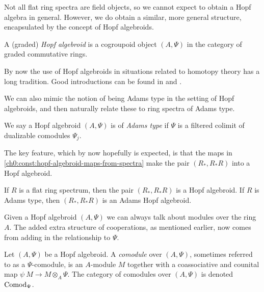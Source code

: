 Not all flat ring spectra are field objects, so we cannot expect to obtain a Hopf algebra in general. However, we do obtain a similar, more general structure, encapsulated by the concept of Hopf algebroids.  

\begin{definition}
    \label{ch0:def:hopf-algebroid}
    A (graded) \emph{Hopf algebroid} is a cogroupoid object $(A, \Psi)$ in the category of graded commutative rings. 
\end{definition}

By now the use of Hopf algebroids in situations related to homotopy theory has a long tradition. Good introductions can be found in \cite[A.1]{ravenel_86} and \cite{hovey_04}. 

We can also mimic the notion of being Adams type in the setting of Hopf algebroids, and then naturally relate these to ring spectra of Adams type. 

\begin{definition}
    \label{ch0:def:adams-hopf-algebroid}
    We say a Hopf algebroid $(A, \Psi)$ is of \emph{Adams type} if $\Psi$ is a filtered colimit of dualizable comodules $\Psi_j$. 
\end{definition}

The key feature, which by now hopefully is expected, is that the maps in \cref{ch0:const:hopf-algebroid-maps-from-spectra} make the pair $(R_*, R_*R)$ into a Hopf algebroid. 

\begin{proposition}
    \label{ch0:prop:hopf-algebroid-from-spectra}
    If $R$ is a flat ring spectrum, then the pair $(R_*, R_*R)$ is a Hopf algebroid. If $R$ is Adams type, then $(R_*, R_*R)$ is an Adams Hopf algebroid. 
\end{proposition}

Given a Hopf algebroid $(A,\Psi)$ we can always talk about modules over the ring $A$. The added extra structure of cooperations, as mentioned earlier, now comes from adding in the relationship to $\Psi$. 

\begin{definition}
    \label{ch0:def:comodule-over-hopf-algebroid}
    Let $(A, \Psi)$ be a Hopf algebroid. A \emph{comodule} over $(A, \Psi)$, sometimes referred to as a $\Psi$-comodule, is an $A$-module $M$ together with a coassociative and counital map $\psi\: M\longrightarrow M\otimes_A \Psi$. The category of comodules over $(A, \Psi)$ is denoted \emph{$\mathrm{Comod}_\Psi$}. 
\end{definition}

